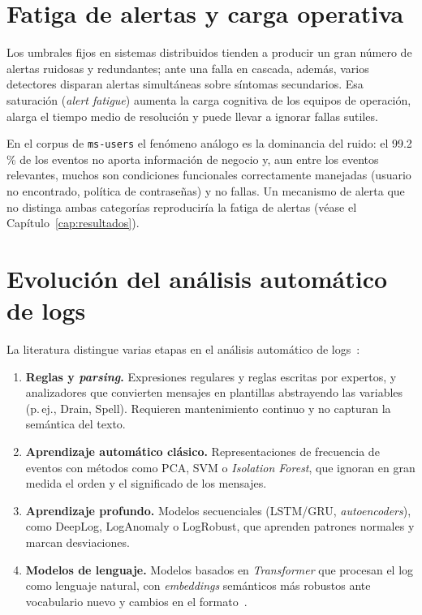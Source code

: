 \section{Fatiga de alertas y carga operativa}\label{sec:ant_fatiga}

Los umbrales fijos en sistemas distribuidos tienden a producir un gran número de alertas ruidosas y redundantes; ante una falla en cascada, además, varios detectores disparan alertas simultáneas sobre síntomas secundarios. Esa saturación (\textit{alert fatigue}) aumenta la carga cognitiva de los equipos de operación, alarga el tiempo medio de resolución y puede llevar a ignorar fallas sutiles. %

En el corpus de \texttt{ms-users} el fenómeno análogo es la dominancia del ruido: el 99.2\,\% de los eventos no aporta información de negocio y, aun entre los eventos relevantes, muchos son condiciones funcionales correctamente manejadas (usuario no encontrado, política de contraseñas) y no fallas. Un mecanismo de alerta que no distinga ambas categorías reproduciría la fatiga de alertas (véase el Capítulo~\ref{cap:resultados}).

\section{Evolución del análisis automático de logs}\label{sec:ant_evolucion_logs}

La literatura distingue varias etapas en el análisis automático de logs~\cite{he2021_survey, jiang2021_aiops, uddin2026_microservice_logs}:

\begin{enumerate}
  \item \textbf{Reglas y \textit{parsing}.} Expresiones regulares y reglas escritas por expertos, y analizadores que convierten mensajes en plantillas abstrayendo las variables (p.\,ej., Drain, Spell). Requieren mantenimiento continuo y no capturan la semántica del texto.
  \item \textbf{Aprendizaje automático clásico.} Representaciones de frecuencia de eventos con métodos como PCA, SVM o \textit{Isolation Forest}, que ignoran en gran medida el orden y el significado de los mensajes.
  \item \textbf{Aprendizaje profundo.} Modelos secuenciales (LSTM/GRU, \textit{autoencoders}), como DeepLog, LogAnomaly o LogRobust, que aprenden patrones normales y marcan desviaciones.
  \item \textbf{Modelos de lenguaje.} Modelos basados en \textit{Transformer} que procesan el log como lenguaje natural, con \textit{embeddings} semánticos más robustos ante vocabulario nuevo y cambios en el formato~\cite{murphy2024_embeddings, liu2024_logprompt, karlsen2024_benchmark}.
\end{enumerate}

